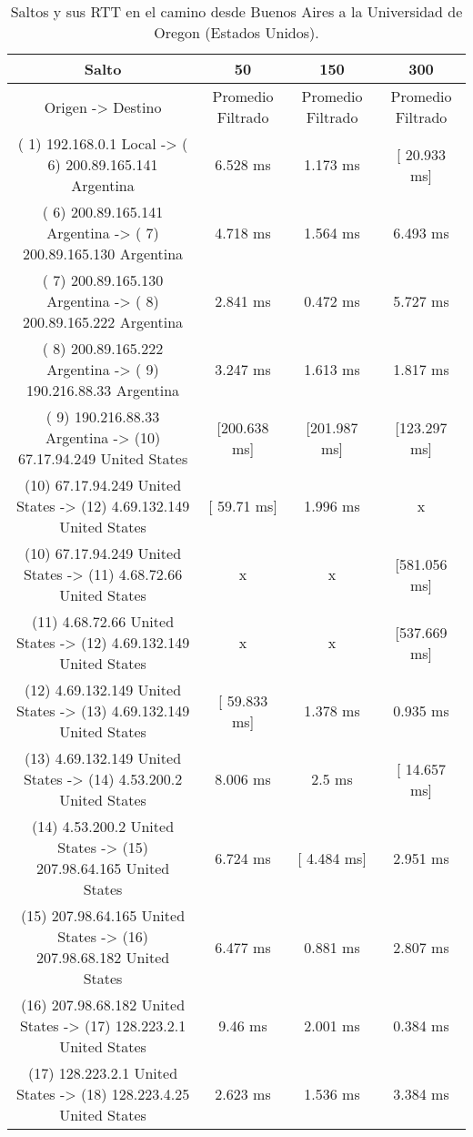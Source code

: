 \begin{table}[]
\centering
\caption{Saltos y sus RTT en el camino desde Buenos Aires a la Universidad de Oregon (Estados Unidos).}
\begin{tabular}{ | c | c | c | c | }
	\hline 
Salto	& 50	& 150	& 300 \\ \hline
               Origen                ->               Destino               	&Promedio Filtrado&	Promedio Filtrado&	Promedio Filtrado \\ \hline
( 1) 192.168.0.1     Local           -> ( 6) 200.89.165.141  Argentina     & 	     6.528 ms  & 	     1.173 ms   &	  [ 20.933 ms]   \\ \hline
( 6) 200.89.165.141  Argentina       -> ( 7) 200.89.165.130  Argentina     & 	     4.718 ms  & 	     1.564 ms   &	     6.493 ms    \\ \hline
( 7) 200.89.165.130  Argentina       -> ( 8) 200.89.165.222  Argentina     & 	     2.841 ms  & 	     0.472 ms   &	     5.727 ms    \\ \hline
( 8) 200.89.165.222  Argentina       -> ( 9) 190.216.88.33   Argentina     & 	     3.247 ms  & 	     1.613 ms   &	     1.817 ms    \\ \hline
( 9) 190.216.88.33   Argentina       -> (10) 67.17.94.249    United States & 	  [200.638 ms] & 	  [201.987 ms]  &	  [123.297 ms]   \\ \hline
(10) 67.17.94.249    United States   -> (12) 4.69.132.149    United States  &	  [  59.71 ms]  &	     1.996 ms    &     	x \\ \hline
(10) 67.17.94.249    United States   -> (11) 4.68.72.66      United States   &       	x      	 &           x	     &     [581.056 ms]   \\ \hline
(11) 4.68.72.66      United States   -> (12) 4.69.132.149    United States  &	       x        &   	       x	     &     [537.669 ms]   \\ \hline
(12) 4.69.132.149    United States   -> (13) 4.69.132.149    United States & 	  [ 59.833 ms] & 	     1.378 ms   &	     0.935 ms    \\ \hline
(13) 4.69.132.149    United States   -> (14) 4.53.200.2      United States & 	     8.006 ms  & 	       2.5 ms   &	  [ 14.657 ms]   \\ \hline
(14) 4.53.200.2      United States   -> (15) 207.98.64.165   United States & 	     6.724 ms  & 	  [  4.484 ms]  &	     2.951 ms    \\ \hline
(15) 207.98.64.165   United States   -> (16) 207.98.68.182   United States & 	     6.477 ms  & 	     0.881 ms   &	     2.807 ms    \\ \hline
(16) 207.98.68.182   United States   -> (17) 128.223.2.1     United States & 	      9.46 ms  & 	     2.001 ms   &	     0.384 ms    \\ \hline
(17) 128.223.2.1     United States   -> (18) 128.223.4.25    United States & 	     2.623 ms  & 	     1.536 ms   &	     3.384 ms    \\ \hline

\end{tabular}
\end{table}
